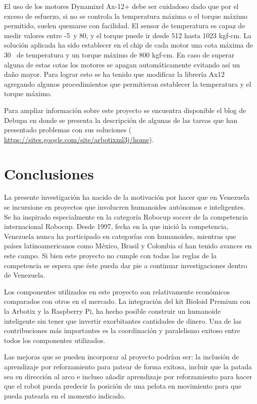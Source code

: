 \documentclass[tikz,conference, letterpaper]{IEEEtranMC1}
\begin{document}
El uso de los motores Dynamixel Ax-12+ debe ser cuidadoso dado que por el exceso de esfuerzo, si no se controla la temperatura máxima o el torque máximo permitido, suelen quemarse con facilidad. El sensor de temperatura es capaz de medir valores entre -5\celsius~y 80\celsius, y el torque puede ir desde 512 hasta 1023 kgf-cm. La solución aplicada ha sido establecer en el chip de cada motor una cota máxima de 30\celsius~ de temperatura y un torque máximo de 800 kgf-cm. En caso de superar alguna de estas cotas los motores se apagan automáticamente evitando así un daño mayor. Para lograr esto se ha tenido que modificar la librería Ax12 agregando algunos procedimientos que permitieran establecer la temperatura y el torque máximo.

Para ampliar información sobre este proyecto se encuentra disponible el blog de Debupa en donde se presenta la descripción de algunas de las tareas que han presentado problemas con sus soluciones (\url{ https://sites.google.com/site/arbotixml3j/home}).


\section{Conclusiones}
\label{sec:Conclusiones}

La presente investigación ha nacido de la motivación por hacer que en Venezuela se incursione en proyectos que involucren humanoides autónomos e inteligentes. Se ha inspirado especialmente en la categoría Robocup soccer de la competencia internacional Robocup. Desde 1997, fecha en la que inició la competencia, Venezuela nunca ha participado en categorías con humanoides, mientras que países latinoamericanos como México, Brasil y Colombia sí han tenido avances en este campo. Si bien este proyecto no cumple con todas las reglas de la competencia se espera que éste pueda dar pie a continuar investigaciones dentro de Venezuela. 

Los componentes utilizados en este proyecto son relativamente económicos comparados con otros en el mercado. La integración del kit Bioloid Premium con la Arbotix y la Raspberry Pi, ha hecho posible construir un humanoide inteligente sin tener que invertir exorbitantes cantidades de dinero. Una de las contribuciones más importantes es la coordinación y paralelismo exitoso entre todos los componentes utilizados.

Las mejoras que se pueden incorporar al proyecto podrían ser: la inclusión de aprendizaje por reforzamiento para patear de forma exitosa, incluir que la patada sea en dirección al arco e incluso añadir aprendizaje por reforzamiento para hacer que el robot pueda predecir la posición de una pelota en movimiento para que pueda patearla en el momento indicado.  





\end{document}
